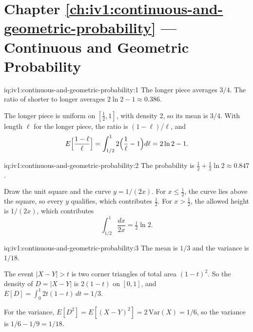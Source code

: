 \section*{Chapter \ref{ch:iv1:continuous-and-geometric-probability} --- Continuous and Geometric Probability}

\begin{solution}{iq:iv1:continuous-and-geometric-probability:1}
The longer piece averages $3/4$. The ratio of shorter to longer averages $2\ln 2 - 1 \approx 0.386$.

The longer piece is uniform on $[\tfrac12, 1]$, with density 2, so its mean is $3/4$. With length $\ell$ for the longer piece, the ratio is $(1 - \ell)/\ell$, and
\[
E\Bigl[\frac{1 - \ell}{\ell}\Bigr] = \int_{1/2}^{1} 2\Bigl(\frac1\ell - 1\Bigr) d\ell = 2\ln 2 - 1.
\]
\end{solution}

\begin{solution}{iq:iv1:continuous-and-geometric-probability:2}
The probability is $\tfrac12 + \tfrac12 \ln 2 \approx 0.847$.

Draw the unit square and the curve $y = 1/(2x)$. For $x \le \tfrac12$, the curve lies above the square, so every $y$ qualifies, which contributes $\tfrac12$. For $x > \tfrac12$, the allowed height is $1/(2x)$, which contributes
\[
\int_{1/2}^{1} \frac{dx}{2x} = \tfrac12 \ln 2.
\]
\end{solution}

\begin{solution}{iq:iv1:continuous-and-geometric-probability:3}
The mean is $1/3$ and the variance is $1/18$.

The event $|X - Y| > t$ is two corner triangles of total area $(1 - t)^2$. So the density of $D = |X - Y|$ is $2(1 - t)$ on $[0, 1]$, and $E[D] = \int_0^1 2t(1 - t)\,dt = 1/3$.

For the variance, $E[D^2] = E[(X - Y)^2] = 2\,\mathrm{Var}(X) = 1/6$, so the variance is $1/6 - 1/9 = 1/18$.

\end{solution}

